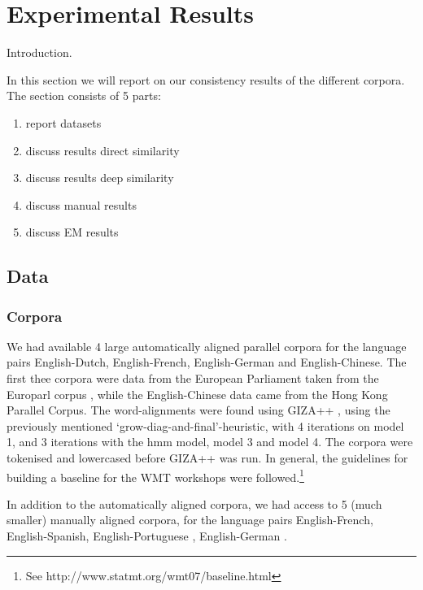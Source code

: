 \documentclass[hidelinks]{report}
\begin{document}
\chapter{Experimental Results}

Introduction.

In this section we will report on our consistency results of the different corpora. The section consists of 5 parts:\begin{enumerate}
\item report datasets
\item discuss results direct similarity
\item discuss results deep similarity
\item discuss manual results
\item discuss EM results
\end{enumerate}


\section{Data}

\subsection{Corpora}

We had available 4 large automatically aligned parallel corpora for the language pairs English-Dutch, English-French, English-German and English-Chinese. The first thee corpora were data from the European Parliament taken from the Europarl corpus \citep{koehn2005europarl}, while the English-Chinese data came from the Hong Kong Parallel Corpus. The word-alignments were found using GIZA++ \citep{och03:asc}, using the previously mentioned `grow-diag-and-final'-heuristic, with 4 iterations on model 1, and 3 iterations with the hmm model, model 3 and model 4. The corpora were tokenised and lowercased before GIZA++ was run. In general, the guidelines for building a baseline for the WMT workshops were followed.\footnote{See http://www.statmt.org/wmt07/baseline.html}

In addition to the automatically aligned corpora, we had access to 5 (much smaller) manually aligned corpora, for the language pairs English-French, \citep{graca2008building,och2000improved} English-Spanish, English-Portuguese \citep{graca2008building}, English-German \citep{pado2006optimal}.
\end{document}
